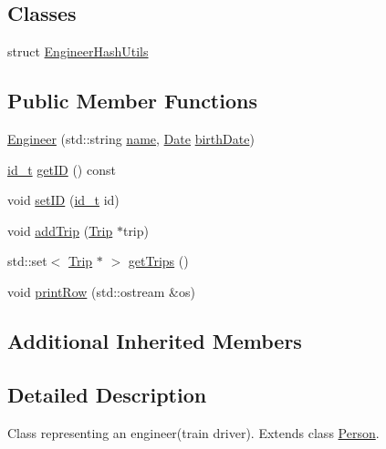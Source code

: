 \subsection*{Classes}
\begin{DoxyCompactItemize}
\item 
struct \mbox{\hyperlink{structEngineer_1_1EngineerHashUtils}{Engineer\+Hash\+Utils}}
\end{DoxyCompactItemize}
\subsection*{Public Member Functions}
\begin{DoxyCompactItemize}
\item 
\mbox{\hyperlink{classEngineer_a608c643d1826e12d503c213679803a60}{Engineer}} (std\+::string \mbox{\hyperlink{classPerson_a7594663aadc0de77616506df8a2f4128}{name}}, \mbox{\hyperlink{classDate}{Date}} \mbox{\hyperlink{classPerson_a7a764b56b815321eeb8412c1dcc4cabf}{birth\+Date}})
\item 
\mbox{\hyperlink{project__utils_8h_a8f3a969054ad2200720b96e7e23dd4e1}{id\+\_\+t}} \mbox{\hyperlink{classEngineer_aa2a341b66e189ef19ab7dfa364cd2c20}{get\+ID}} () const
\item 
void \mbox{\hyperlink{classEngineer_ad413cf55ffbef71b3d5d58aa522da8cf}{set\+ID}} (\mbox{\hyperlink{project__utils_8h_a8f3a969054ad2200720b96e7e23dd4e1}{id\+\_\+t}} id)
\item 
void \mbox{\hyperlink{classEngineer_a399ceec45f4608f743070893ac573dcc}{add\+Trip}} (\mbox{\hyperlink{classTrip}{Trip}} $\ast$trip)
\item 
std\+::set$<$ \mbox{\hyperlink{classTrip}{Trip}} $\ast$ $>$ \mbox{\hyperlink{classEngineer_af2dd8a34a1f90956e9c31043638518cf}{get\+Trips}} ()
\item 
void \mbox{\hyperlink{classEngineer_a75fdfc733d86cb8dc2ff243994716da1}{print\+Row}} (std\+::ostream \&os)
\end{DoxyCompactItemize}
\subsection*{Additional Inherited Members}


\subsection{Detailed Description}
Class representing an engineer(train driver). Extends class \mbox{\hyperlink{classPerson}{Person}}. 

